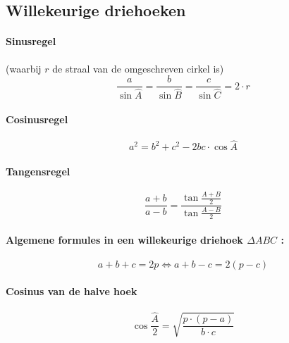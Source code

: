  \subsection{Willekeurige driehoeken}
 \label{sec:wk_drhk}
  
\paragraph{Sinusregel}
\label{sec:Sinusregel}
 (waarbij $r$ de straal van de omgeschreven cirkel is)
   \[
	   \frac{a}{\sin \widehat{A}} = \frac{b}{\sin \widehat{B}} = \frac{c}{\sin \widehat{C}} = 2 \cdot r
   \]
  
\paragraph{Cosinusregel}
\label{sec:Cosinusregel}
   \[
	   a^{2}=b^{2}+c^{2}-2bc\cdot\cos\widehat{A}
   \]
  
  
\paragraph{Tangensregel}
\label{sec:Tangensregel}
   \[
	   \frac{a+b}{a-b}=\frac{\tan\frac{A+B}{2}}{\tan\frac{A-B}{2}}
   \]
   
  
\paragraph{Algemene formules in een willekeurige driehoek $\Delta ABC$ :}
\label{sec:AlgemeneFormulesWKdriehoek}
   \[
	   a + b + c = 2p \Leftrightarrow a + b - c = 2(p - c)
   \]
   
  
\paragraph{Cosinus van de halve hoek}
\label{sec:CosinusHalveHoek}
   \[
	    \cos\frac{\widehat{A}}{2}=\sqrt{\frac{p\cdot\left(p-a\right)}{b\cdot c}}
   \]  
  
